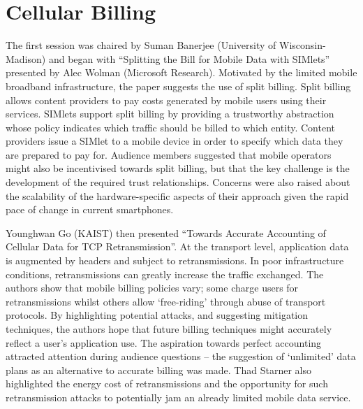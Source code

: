 \section{Cellular Billing}
\label{sec:cellbilling}

The first session was chaired by Suman Banerjee (University of Wisconsin-Madison)
and began with ``Splitting the Bill for Mobile Data with SIMlets'' presented by 
Alec Wolman (Microsoft Research). Motivated by the limited mobile broadband 
infrastructure, the paper suggests the use of split billing. Split billing allows 
content providers to pay costs generated by mobile users using their services.
SIMlets support split billing by providing a trustworthy abstraction whose policy indicates which traffic should be billed to 
which entity. Content providers issue a SIMlet to a mobile device in order to 
specify which data they are prepared to pay for.
Audience members suggested that mobile operators might also be incentivised 
towards split billing, but that the key challenge is the development of the 
required trust relationships. Concerns were also raised about the scalability of the hardware-specific aspects of their approach given the rapid pace of change in
current smartphones.

Younghwan Go (KAIST) then presented ``Towards Accurate Accounting of Cellular 
Data for TCP Retransmission''. At the transport level, application data
is augmented by headers and subject to retransmissions. In 
poor infrastructure conditions, retransmissions can greatly increase the traffic 
exchanged. The authors show that mobile billing policies vary; some charge users 
for retransmissions whilst others allow `free-riding' through abuse of transport 
protocols. By highlighting potential attacks, and suggesting mitigation 
techniques, the authors hope that future billing techniques might accurately 
reflect a user's application use.
The aspiration towards perfect accounting attracted attention during audience
questions -- the suggestion of `unlimited' data plans as an
alternative to accurate billing was made. Thad Starner also highlighted the 
energy cost of retransmissions %
and the opportunity for such retransmission attacks to potentially jam an already 
limited mobile data service.